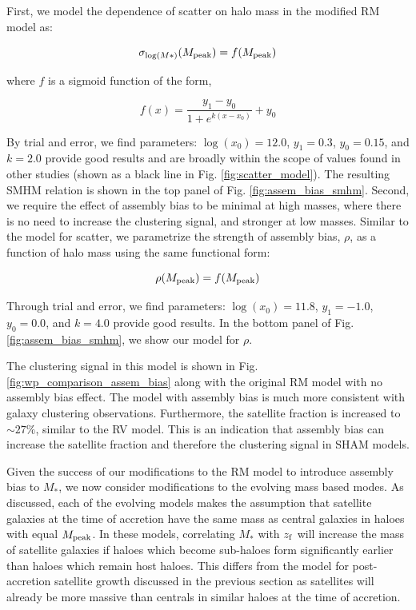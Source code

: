 \documentclass[a4paper,fleqn,usenatbib]{mnras}
\begin{document}
First, we model the dependence of scatter on halo mass in the modified RM model as:
%
\begin{linenomath}
\begin{equation}
\sigma_{\log(M*)}(M_{\rm peak}) = f(M_{\rm peak})
\end{equation}
\end{linenomath}
%
where $f$ is a sigmoid function of the form,
%
\begin{linenomath}
\begin{equation}
f(x) = \frac{y_1 - y_0}{1+ e^{k(x-x_0)}} + y_0
\end{equation}
\end{linenomath}
%
By trial and error, we find parameters: $\log(x_{0})=12.0$, $y_1=0.3$, $y_0=0.15$, and $k=2.0$ provide good results and are broadly within the scope of values found in other studies (shown as a black line in Fig. \ref{fig:scatter_model}).  The resulting SMHM relation is shown in the top panel of Fig. \ref{fig:assem_bias_smhm}.  Second, we require the effect of assembly bias to be minimal at high masses, where there is no need to increase the clustering signal, and stronger at low masses.  Similar to the model for scatter, we parametrize the strength of assembly bias, $\rho$, as a function of halo mass using the same functional form:
%
\begin{linenomath}
\begin{equation}
\rho(M_{\rm peak}) = f(M_{\rm peak})
\end{equation}
\end{linenomath}
%
Through trial and error, we find parameters: $\log(x_{0})=11.8$, $y_1=-1.0$, $y_0=0.0$, and $k=4.0$ provide good results.  In the bottom panel of Fig. \ref{fig:assem_bias_smhm}, we show our model for $\rho$.

The clustering signal in this model is shown in Fig. \ref{fig:wp_comparison_assem_bias} along with the original RM model with no assembly bias effect.  The model with assembly bias is much more consistent with galaxy clustering observations.  Furthermore, the satellite fraction is increased to $\sim 27\%$, similar to the RV model.  This is an indication that assembly bias can increase the satellite fraction and therefore the clustering signal in SHAM models. 

Given the success of our modifications to the RM model to introduce assembly bias to $M_*$, we now consider modifications to the evolving mass based modes.  As discussed, each of the evolving models makes the assumption that satellite galaxies at the time of accretion have the same mass as central galaxies in haloes with equal $M_{\rm peak}$.  In these models, correlating $M_*$ with $z_{\rm f}$ will increase the mass of satellite galaxies if haloes which become sub-haloes form significantly earlier than haloes which remain host haloes.  This differs from the model for post-accretion satellite growth discussed in the previous section as satellites will already be more massive than centrals in similar haloes at the time of accretion.     
\end{document}
